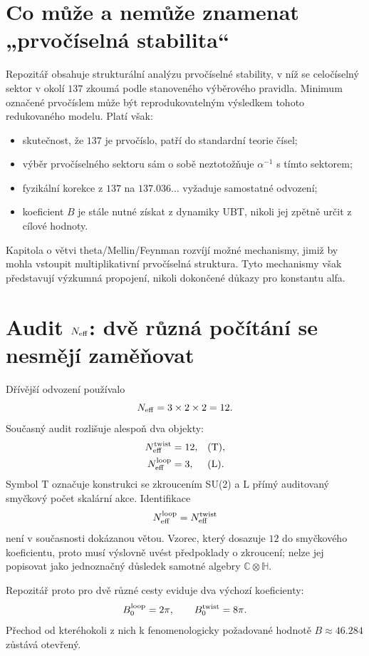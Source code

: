 \section{Co může a nemůže znamenat „prvočíselná stabilita“}
Repozitář obsahuje strukturální analýzu prvočíselné stability, v níž se
celočíselný sektor v okolí $137$ zkoumá podle stanoveného výběrového pravidla.
Minimum označené prvočíslem může být reprodukovatelným výsledkem tohoto
redukovaného modelu. Platí však:
\begin{itemize}
 \item skutečnost, že $137$ je prvočíslo, patří do standardní teorie čísel;
 \item výběr prvočíselného sektoru sám o sobě neztotožňuje
       $\alpha^{-1}$ s tímto sektorem;
 \item fyzikální korekce z $137$ na $137.036\ldots$ vyžaduje samostatné
       odvození;
 \item koeficient $B$ je stále nutné získat z dynamiky UBT, nikoli jej zpětně
       určit z cílové hodnoty.
\end{itemize}
Kapitola o větvi theta/Mellin/Feynman rozvíjí možné mechanismy, jimiž by mohla
vstoupit multiplikativní prvočíselná struktura. Tyto mechanismy však představují
výzkumná propojení, nikoli dokončené důkazy pro konstantu alfa.

\section{Audit \(N_{\rm eff}\): dvě různá počítání se nesmějí zaměňovat}
Dřívější odvození používalo
\[
 N_{\rm eff}=3\times2\times2=12.
\]
Současný audit rozlišuje alespoň dva objekty:
\begin{align*}
 N_{\rm eff}^{\rm twist}&=12,
 &&(\mathrm T),\\
 N_{\rm eff}^{\rm loop}&=3,
 &&(\mathrm L).
\end{align*}
Symbol $\mathrm T$ označuje konstrukci se zkroucením SU(2) a $\mathrm L$ přímý
auditovaný smyčkový počet skalární akce.
Identifikace
\[
 N_{\rm eff}^{\rm loop}=N_{\rm eff}^{\rm twist}
\]
není v současnosti dokázanou větou. Vzorec, který dosazuje $12$ do smyčkového
koeficientu, proto musí výslovně uvést předpoklady o zkroucení; nelze jej
popisovat jako jednoznačný důsledek samotné algebry
$\mathbb C\otimes\mathbb H$.

Repozitář proto pro dvě různé cesty eviduje dva výchozí koeficienty:
\[
 B_0^{\rm loop}=2\pi,
 \qquad
 B_0^{\rm twist}=8\pi.
\]
Přechod od kteréhokoli z nich k fenomenologicky požadované hodnotě
$B\approx46.284$ zůstává otevřený.

